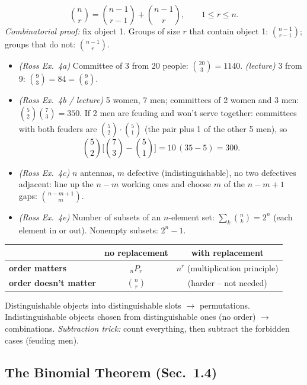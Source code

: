 \documentclass[11pt]{article}
\let\oldsubsection\subsection
\renewcommand{\subsection}{\Needspace{14\baselineskip}\oldsubsection}
\newcommand{\nCr}[2]{\binom{#1}{#2}}
\newcommand{\nPr}[2]{{}_{#1}P_{#2}}
\begin{document}
\begin{thmbox}
\[ \nCr{n}{r}=\nCr{n-1}{r-1}+\nCr{n-1}{r},\qquad 1\le r\le n. \]
\emph{Combinatorial proof:} fix object 1. Groups of size $r$ that contain object 1: $\nCr{n-1}{r-1}$; groups that do not: $\nCr{n-1}{r}$.
\end{thmbox}

\begin{exbox}[Examples]
\begin{itemize}
\item \emph{(Ross Ex.\ 4a)} Committee of 3 from 20 people: $\nCr{20}3=1140$. \emph{(lecture)} 3 from 9: $\nCr93=84=\nCr96$.
\item \emph{(Ross Ex.\ 4b / lecture)} 5 women, 7 men; committees of 2 women and 3 men: $\nCr52\nCr73=350$. If 2 men are feuding and won't serve together: committees with both feuders are $\nCr52\cdot\nCr51$ (the pair plus 1 of the other 5 men), so
\[ \nCr52\Big[\nCr73-\nCr51\Big]=10\,(35-5)=300. \]
\item \emph{(Ross Ex.\ 4c)} $n$ antennas, $m$ defective (indistinguishable), no two defectives adjacent: line up the $n-m$ working ones and choose $m$ of the $n-m+1$ gaps: $\nCr{n-m+1}{m}$.
\item \emph{(Ross Ex.\ 4e)} Number of subsets of an $n$-element set: $\sum_k\nCr nk=2^n$ (each element in or out). Nonempty subsets: $2^n-1$.
\end{itemize}
\end{exbox}

\begin{warnbox}
\begin{center}
\begin{tabular}{l|c|c}
 & \textbf{no replacement} & \textbf{with replacement}\\\hline
\textbf{order matters} & $\nPr nr$ & $n^r$ (multiplication principle)\\
\textbf{order doesn't matter} & $\nCr nr$ & (harder -- not needed)\\
\end{tabular}
\end{center}
Distinguishable objects into distinguishable slots $\to$ permutations. Indistinguishable objects chosen from distinguishable ones (no order) $\to$ combinations. \emph{Subtraction trick:} count everything, then subtract the forbidden cases (feuding men).
\end{warnbox}

\subsection{The Binomial Theorem (Sec.\ 1.4)}
\end{document}

